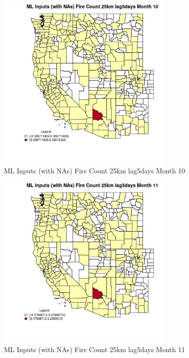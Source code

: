 \begin{figure} 
\centering  
\includegraphics[width=0.77\textwidth]{Code_Outputs/Report_ML_input_PM25_Step4_part_e_de_duplicated_aves_compiled_2019-05-20wNAs_CountyFire_Count_25km_lag5daysmedianMonth10.jpg} 
\caption{\label{fig:Report_ML_input_PM25_Step4_part_e_de_duplicated_aves_compiled_2019-05-20wNAsCountyFire_Count_25km_lag5daysmedianMonth10}ML Inputs (with NAs) Fire Count 25km lag5days Month 10} 
\end{figure} 
 

\clearpage 

\begin{figure} 
\centering  
\includegraphics[width=0.77\textwidth]{Code_Outputs/Report_ML_input_PM25_Step4_part_e_de_duplicated_aves_compiled_2019-05-20wNAs_CountyFire_Count_25km_lag5daysmedianMonth11.jpg} 
\caption{\label{fig:Report_ML_input_PM25_Step4_part_e_de_duplicated_aves_compiled_2019-05-20wNAsCountyFire_Count_25km_lag5daysmedianMonth11}ML Inputs (with NAs) Fire Count 25km lag5days Month 11} 
\end{figure} 
 

